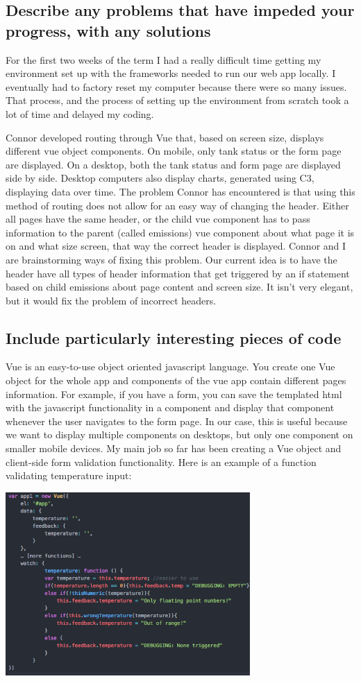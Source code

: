 \documentclass[draftclsnofoot,onecolumn,letterpaper,10pt,compsoc]{IEEEtran}
\begin{document}
\subsection{Describe any problems that have impeded your progress, with any solutions}
For the first two weeks of the term I had a really difficult time getting my environment set up with the frameworks needed to run our web app locally. I eventually had to factory reset my computer because there were so many issues. That process, and the process of setting up the environment from scratch took a lot of time and delayed my coding.

Connor developed routing through Vue that, based on screen size, displays different vue object components. On mobile, only tank status or the form page are displayed. On a desktop, both the tank status and form page are displayed side by side. Desktop computers also display charts, generated using C3, displaying data over time. The problem Connor has encountered is that using this method of routing does not allow for an easy way of changing the header. Either all pages have the same header, or the child vue component has to pass information to the parent (called emissions) vue component about what page it is on and what size screen, that way the correct header is displayed. Connor and I are brainstorming ways of fixing this problem. Our current idea is to have the header have all types of header information that get triggered by an if statement based on child emissions about page content and screen size. It isn’t very elegant, but it would fix the problem of incorrect headers.

\subsection{Include particularly interesting pieces of code}
Vue is an easy-to-use object oriented javascript language. You create one Vue object for the whole app and components of the vue app contain different pages information. For example, if you have a form, you can save the templated html with the javascript functionality in a component and display that component whenever the user navigates to the form page. In our case, this is useful because we want to display multiple components on desktops, but only one component on smaller mobile devices.
My main job so far has been creating a Vue object and client-side form validation functionality. Here is an example of a function validating temperature input:


\centerline{\includegraphics[height=7cm]{screenshots/vuecode.png}}
\end{document}
